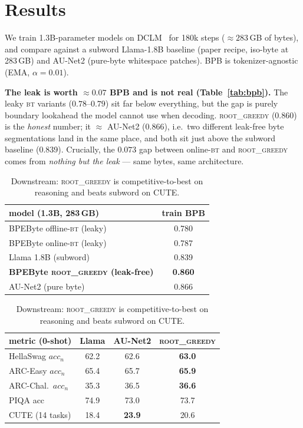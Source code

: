 \documentclass{article} %
\newcommand{\rg}{\textsc{root\_greedy}}
\newcommand{\bt}{\textsc{bt}}
\begin{document}
\section{Results}
\vspace{-2pt}
We train 1.3B-parameter models on DCLM~\citep{li2024dclm} for 180k steps ($\approx283$\,GB of bytes),
and compare against a subword Llama-1.8B baseline (paper recipe, iso-byte at 283\,GB) and AU-Net2
(pure-byte whitespace patches). BPB is tokenizer-agnostic (EMA, $\alpha{=}0.01$).

\noindent\textbf{The leak is worth $\approx0.07$ BPB and is not real
(Table~\ref{tab:bpb}).} The leaky \bt{} variants ($0.78$--$0.79$) sit far below everything, but the
gap is purely boundary lookahead the model cannot use when decoding. \rg{} (0.860) is the
\emph{honest} number; it $\approx$ AU-Net2 (0.866), i.e.\ two different leak-free byte segmentations
land in the same place, and both sit just above the subword baseline (0.839). Crucially, the
$0.073$ gap between online-\bt{} and \rg{} comes from \emph{nothing but the leak} --- same bytes,
same architecture.

\begin{table}[t]
\centering
\small
\begin{minipage}[t]{0.46\textwidth}
\centering
\begin{tabular}{lc}
\toprule
model (1.3B, 283\,GB) & train BPB \\
\midrule
BPEByte offline-\bt{} (leaky) & 0.780 \\
BPEByte online-\bt{} (leaky)  & 0.787 \\
Llama 1.8B (subword)          & 0.839 \\
\textbf{BPEByte \rg{} (leak-free)} & \textbf{0.860} \\
AU-Net2 (pure byte)           & 0.866 \\
\bottomrule
\end{tabular}
\caption{Honest BPB. The leaky variants peek; \rg{} does not.}
\label{tab:bpb}
\end{minipage}\hfill
\begin{minipage}[t]{0.50\textwidth}
\centering
\begin{tabular}{lccc}
\toprule
metric (0-shot) & Llama & AU-Net2 & \rg{} \\
\midrule
HellaSwag $acc_n$  & 62.2 & 62.6 & \textbf{63.0} \\
ARC-Easy $acc_n$   & 65.4 & 65.7 & \textbf{65.9} \\
ARC-Chal.\ $acc_n$ & 35.3 & 36.5 & \textbf{36.6} \\
PIQA acc           & 74.9 & 73.0 & 73.7 \\
CUTE (14 tasks)    & 18.4 & \textbf{23.9} & 20.6 \\
\bottomrule
\end{tabular}
\caption{Downstream: \rg{} is competitive-to-best on reasoning and beats subword on CUTE.}
\label{tab:down}
\end{minipage}
\vspace{-12pt}
\end{table}
\end{document}
